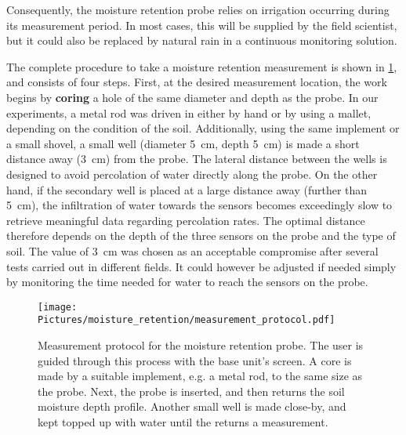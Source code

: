 Consequently, the moisture retention probe relies on irrigation occurring during its measurement period. In most cases, this will be supplied by the field scientist, but it could also be replaced by natural rain in a continuous monitoring solution.

The complete procedure to take a moisture retention measurement is shown in \cref{fmeasurementprotocol}, and consists of four steps. First, at the desired measurement location, the work begins by \textbf{coring} a hole of the same diameter and depth as the probe. In our experiments, a metal rod was driven in either by hand or by using a mallet, depending on the condition of the soil. Additionally, using the same implement or a small shovel, a small well (diameter \SI{5}{cm}, depth \SI{5}{cm}) is made a short distance away (\SI{3}{cm}) from the probe. The lateral distance between the wells is designed to avoid percolation of water directly along the probe. On the other hand, if the secondary well is placed at a large distance away (further than \SI{5}{cm}), the infiltration of water towards the sensors becomes exceedingly slow to retrieve meaningful data regarding percolation rates. The optimal distance therefore depends on the depth of the three sensors on the probe and the type of soil. The value of \SI{3}{cm} was chosen as an acceptable compromise after several tests carried out in different fields. It could however be adjusted if needed simply by monitoring the time needed for water to reach the sensors on the probe.

\begin{figure}[b]
    \centering
    \texttt{[image: Pictures/moisture\_retention/measurement\_protocol.pdf]}
    \captionsetup{justification = centering}
    \caption{Measurement protocol for the moisture retention probe. The user is guided through this process with the base unit's screen. A core is made by a suitable implement, e.g. a metal rod, to the same size as the probe. Next, the probe is inserted, and then returns the soil moisture depth profile. Another small well is made close-by, and kept topped up with water until the  returns a measurement.}
    \label{fmeasurementprotocol}
\end{figure}


